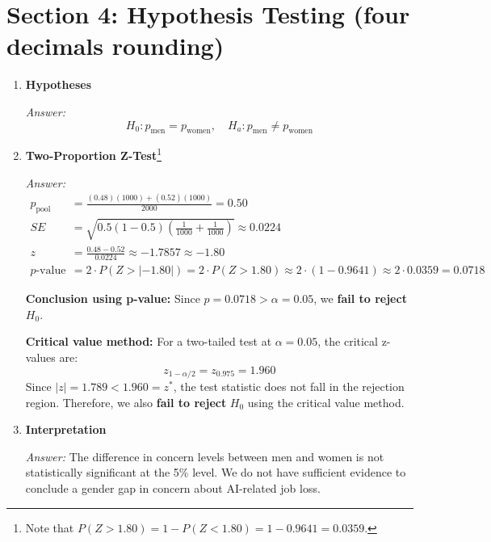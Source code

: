 \documentclass[12pt]{article}
\begin{document}
\section*{Section 4: Hypothesis Testing (four decimals rounding)}

\begin{enumerate}[label=4.\arabic*]
    \item \textbf{Hypotheses}

    \textit{Answer:}  
\[
    H_0: p_{\text{men}} = p_{\text{women}}, \quad H_a: p_{\text{men}} \neq p_{\text{women}}
\]

    \item \textbf{Two-Proportion Z-Test}\text{ }\footnote{Note that $P(Z > 1.80) = 1 - P(Z < 1.80) = 1-0.9641 = 0.0359$.}

    \textit{Answer:}  
    \begin{align*}
    p_{\text{pool}} &= \frac{(0.48)(1000) + (0.52)(1000)}{2000} = 0.50 \\
    SE &= \sqrt{0.5(1-0.5)\left(\frac{1}{1000} + \frac{1}{1000}\right)} \approx 0.0224 \\
    z &= \frac{0.48 - 0.52}{0.0224} \approx \boxed{-1.7857}  \approx - 1.80 \\
    p\text{-value} &= 2 \cdot P(Z > |- 1.80|) = 2 \cdot P(Z > 1.80) \approx 2\cdot (1-0.9641) \approx  2 \cdot 0.0359 = \boxed{0.0718} 
    \end{align*}

    \textbf{Conclusion using p-value:} Since $p = 0.0718 > \alpha = 0.05$, we \textbf{fail to reject} $H_0$.

    \textbf{Critical value method:} For a two-tailed test at $\alpha = 0.05$, the critical z-values are:
\[
    z_{1-\alpha/2} = z_{0.975} = \boxed{1.960}
\]
    Since $\left| z \right| = 1.789 < 1.960=z^*$, the test statistic does not fall in the rejection region. Therefore, we also \textbf{fail to reject} $H_0$ using the critical value method.
    
    \item \textbf{Interpretation}

    \textit{Answer:} The difference in concern levels between men and women is not statistically significant at the 5\% level. We do not have sufficient evidence to conclude a gender gap in concern about AI-related job loss.
\end{enumerate}



\newpage 
\end{document}
